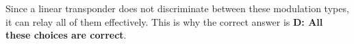 Since a linear transponder does not discriminate between these modulation types, it can relay all of them effectively. This is why the correct answer is \textbf{D: All these choices are correct}.

